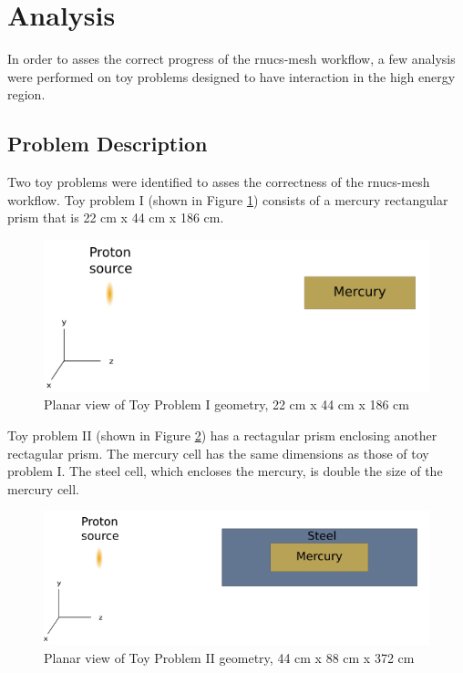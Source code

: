 \section{Analysis}\label{sc:analysis}
In order to asses the correct progress of the rnucs-mesh workflow, a few 
analysis were performed on toy problems designed to have interaction in the 
high energy region. 

\subsection{Problem Description}
Two toy problems were identified to asses the correctness of the 
rnucs-mesh workflow. 
Toy problem I (shown in Figure \ref{TPI}) consists of a mercury rectangular prism that is 
22 cm x 44 cm x 186 cm. 

\begin{figure}[h!]
\begin{centering}
\includegraphics[width=0.60\linewidth]{../figs/mercury.png}
\caption{Planar view of Toy Problem I geometry, 22 cm  x 44 cm x 186 cm }
\label{TPI}
\end{centering}
\end{figure}
Toy problem II (shown in Figure \ref{TPII}) has a rectagular prism enclosing another rectagular
prism. 
The mercury cell has the same dimensions as those of toy problem I. The steel 
cell, which encloses the mercury, is double the size of the mercury cell. 
\begin{figure}[h!]
\begin{centering}
\includegraphics[width=0.70\linewidth]{../figs/mer_steel.png}
\caption{Planar view of Toy Problem II geometry, 44 cm  x 88 cm x 372 cm }
\label{TPII}
\end{centering}
\end{figure}

